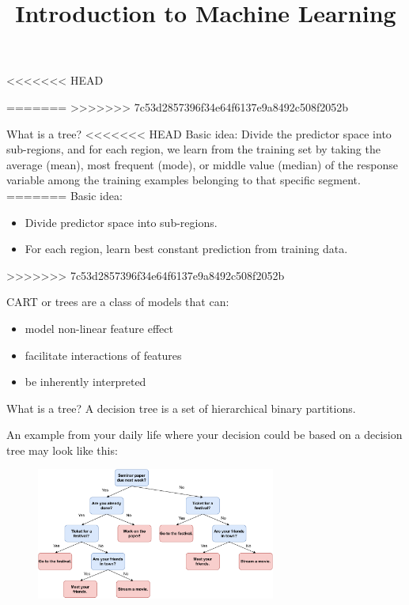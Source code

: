 \documentclass[11pt,compress,t,notes=noshow, xcolor=table]{beamer}
\title{Introduction to Machine Learning}
\institute{\href{https://compstat-lmu.github.io/lecture_i2ml/}{compstat-lmu.github.io/lecture\_i2ml}}
\date{}
\begin{document}
<<<<<<< HEAD

=======
>>>>>>> 7c53d2857396f34e64f6137e9a8492c508f2052b
\sloppy

\begin{vbframe}{What is a tree?}
<<<<<<< HEAD
Basic idea: Divide the predictor space into sub-regions, and for each region, we learn from the training set by taking the average (mean), most frequent (mode), or middle value (median) of the response variable among the training examples belonging to that specific segment.
=======
Basic idea: 
\begin{itemize}
\item Divide predictor space into sub-regions.%
\item For each region, learn best constant prediction from  training data. %
\end{itemize}
>>>>>>> 7c53d2857396f34e64f6137e9a8492c508f2052b

\vspace{0.5cm}

    CART or trees are a class of models that can:
  \begin{itemize}
    \item model non-linear feature effect
    \item facilitate interactions of features
    \item be inherently interpreted
  \end{itemize}
\end{vbframe}

\begin{vbframe}{What is a tree?}
A decision tree is a set of hierarchical binary partitions.

An example from your daily life where your decision could be based on a decision tree may look like this:

  \begin{figure}
    \centering
\includegraphics[width=0.7\textwidth, keepaspectratio]{figure/nutshell-example.pdf}
    \end{figure}

\end{vbframe}
\end{document}
